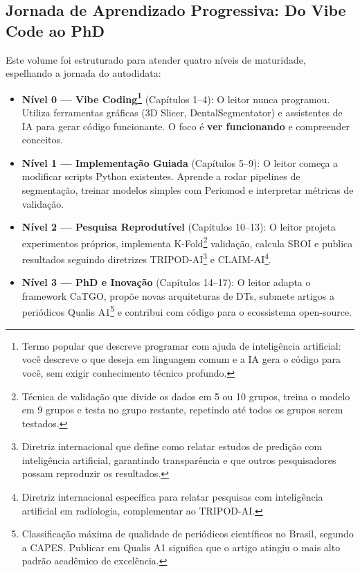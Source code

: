 
\subsection{Jornada de Aprendizado Progressiva: Do Vibe Code ao PhD}

Este volume foi estruturado para atender quatro níveis de maturidade, espelhando a jornada do autodidata:

\begin{itemize}
    \item \textbf{Nível 0 --- Vibe Coding\footnote[22]{Termo popular que descreve programar com ajuda de inteligência artificial: você descreve o que deseja em linguagem comum e a IA gera o código para você, sem exigir conhecimento técnico profundo.}} (Capítulos 1--4): O leitor nunca programou. Utiliza ferramentas gráficas (3D Slicer, DentalSegmentator) e assistentes de IA para gerar código funcionante. O foco é \textbf{ver funcionando} e compreender conceitos.
    
    \item \textbf{Nível 1 --- Implementação Guiada} (Capítulos 5--9): O leitor começa a modificar scripts Python existentes. Aprende a rodar pipelines de segmentação, treinar modelos simples com Periomod e interpretar métricas de validação.
    
    \item \textbf{Nível 2 --- Pesquisa Reprodutível} (Capítulos 10--13): O leitor projeta experimentos próprios, implementa K-Fold\footnote[23]{Técnica de validação que divide os dados em 5 ou 10 grupos, treina o modelo em 9 grupos e testa no grupo restante, repetindo até todos os grupos serem testados.} validação, calcula SROI e publica resultados seguindo diretrizes TRIPOD-AI\footnote[24]{Diretriz internacional que define como relatar estudos de predição com inteligência artificial, garantindo transparência e que outros pesquisadores possam reproduzir os resultados.} e CLAIM-AI\footnote[27]{Diretriz internacional específica para relatar pesquisas com inteligência artificial em radiologia, complementar ao TRIPOD-AI.}.
    
    \item \textbf{Nível 3 --- PhD e Inovação} (Capítulos 14--17): O leitor adapta o framework CaTGO, propõe novas arquiteturas de DTs, submete artigos a periódicos Qualis A1\footnote[25]{Classificação máxima de qualidade de periódicos científicos no Brasil, segundo a CAPES. Publicar em Qualis A1 significa que o artigo atingiu o mais alto padrão acadêmico de excelência.} e contribui com código para o ecossistema open-source.
\end{itemize}

